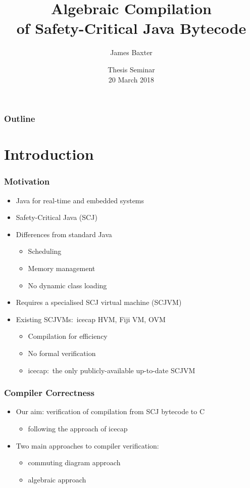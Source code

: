 \documentclass{beamer}
\title[Algebraic Compilation of Safety-Critical Java Bytecode]{Algebraic Compilation\\of Safety-Critical Java Bytecode}
\author{James Baxter}
\date[2018-03-20]{Thesis Seminar\\20 March 2018}
\begin{document}
\frame[plain]{\titlepage}

\begin{frame}
\frametitle{Outline}
\tableofcontents
\end{frame}

\section{Introduction}

\begin{frame}
  \frametitle{Motivation}
  \begin{itemize}
  \item Java for real-time and embedded systems
  \item Safety-Critical Java (SCJ)
  \item Differences from standard Java
    \begin{itemize}
    \item Scheduling
    \item Memory management
    \item No dynamic class loading
    \end{itemize}
  \item Requires a specialised SCJ virtual machine (SCJVM)
  \item Existing SCJVMs:~icecap HVM, Fiji VM, OVM
    \begin{itemize}
    \item Compilation for efficiency
    \item No formal verification
    \item icecap:~the only publicly-available up-to-date SCJVM
    \end{itemize}
  \end{itemize}
\end{frame}

\begin{frame}
  \frametitle{Compiler Correctness}
  \begin{itemize}
  \item Our aim: verification of compilation from SCJ bytecode to C
    \begin{itemize}
    \item following the approach of icecap
    \end{itemize}
  \item Two main approaches to compiler verification:
    \begin{itemize}
    \item commuting diagram approach
    \item algebraic approach 
    \end{itemize}
  \end{itemize}
\end{frame}
\end{document}
